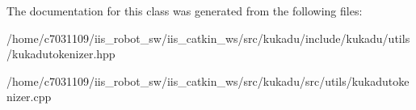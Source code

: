 The documentation for this class was generated from the following files\-:\begin{DoxyCompactItemize}
\item 
/home/c7031109/iis\-\_\-robot\-\_\-sw/iis\-\_\-catkin\-\_\-ws/src/kukadu/include/kukadu/utils/kukadutokenizer.\-hpp\item 
/home/c7031109/iis\-\_\-robot\-\_\-sw/iis\-\_\-catkin\-\_\-ws/src/kukadu/src/utils/kukadutokenizer.\-cpp\end{DoxyCompactItemize}
